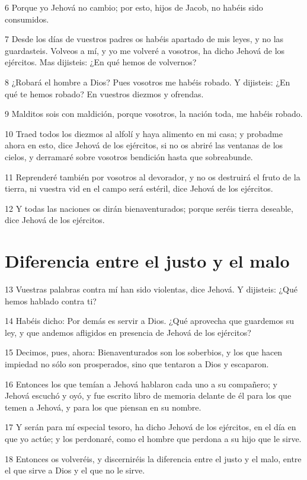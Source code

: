 \par 6 Porque yo Jehová no cambio; por esto, hijos de Jacob, no habéis sido consumidos. 
\par 7 Desde los días de vuestros padres os habéis apartado de mis leyes, y no las guardasteis. Volveos a mí, y yo me volveré a vosotros, ha dicho Jehová de los ejércitos. Mas dijisteis: ¿En qué hemos de volvernos?
\par 8 ¿Robará el hombre a Dios? Pues vosotros me habéis robado. Y dijisteis: ¿En qué te hemos robado? En vuestros diezmos y ofrendas.
\par 9 Malditos sois con maldición, porque vosotros, la nación toda, me habéis robado.
\par 10 Traed todos los diezmos al alfolí y haya alimento en mi casa; y probadme ahora en esto, dice Jehová de los ejércitos, si no os abriré las ventanas de los cielos, y derramaré sobre vosotros bendición hasta que sobreabunde.
\par 11 Reprenderé también por vosotros al devorador, y no os destruirá el fruto de la tierra, ni vuestra vid en el campo será estéril, dice Jehová de los ejércitos.
\par 12 Y todas las naciones os dirán bienaventurados; porque seréis tierra deseable, dice Jehová de los ejércitos.

\section*{Diferencia entre el justo y el malo}

\par 13 Vuestras palabras contra mí han sido violentas, dice Jehová. Y dijisteis: ¿Qué hemos hablado contra ti?
\par 14 Habéis dicho: Por demás es servir a Dios. ¿Qué aprovecha que guardemos su ley, y que andemos afligidos en presencia de Jehová de los ejércitos?
\par 15 Decimos, pues, ahora: Bienaventurados son los soberbios, y los que hacen impiedad no sólo son prosperados, sino que tentaron a Dios y escaparon.
\par 16 Entonces los que temían a Jehová hablaron cada uno a su compañero; y Jehová escuchó y oyó, y fue escrito libro de memoria delante de él para los que temen a Jehová, y para los que piensan en su nombre.
\par 17 Y serán para mí especial tesoro, ha dicho Jehová de los ejércitos, en el día en que yo actúe; y los perdonaré, como el hombre que perdona a su hijo que le sirve.
\par 18 Entonces os volveréis, y discerniréis la diferencia entre el justo y el malo, entre el que sirve a Dios y el que no le sirve.

